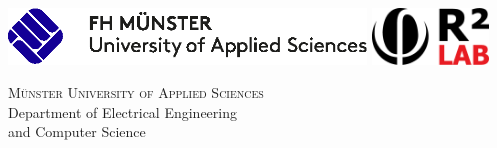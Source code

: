 
\begin{titlepage}
	
		\begin{center}
	        \large  
	
	        \hfill
	
	        \vfill
	        
	        \begin{addmargin}[-1.1cm]{-0.6cm}
	        
		        \includegraphics[height=1.5cm]{Figures/Logo-FH-Muenster}
				\hfill
				\includegraphics[height=1.5cm]{Figures/phi_small}
			
			\end{addmargin}  
	
			\vfill
				
			{\Large \textsc{Münster University of Applied Sciences}} \\
			\vspace{0.2cm}
			Department of Electrical Engineering \\
			and Computer Science
	        
	        \vfill
	
	        \begingroup
	            \color{Maroon}\spacedallcaps{\myTitle} \\ \bigskip
	        \endgroup
	
	        \spacedlowsmallcaps{\myName}
	        
	        \vfill
	        
	        \textit{\mySubtitle} \\
	            
	        \vfill              
	        
	        \myTime   
	        
	        \vfill  
	
		\end{center}      
\end{titlepage}   
